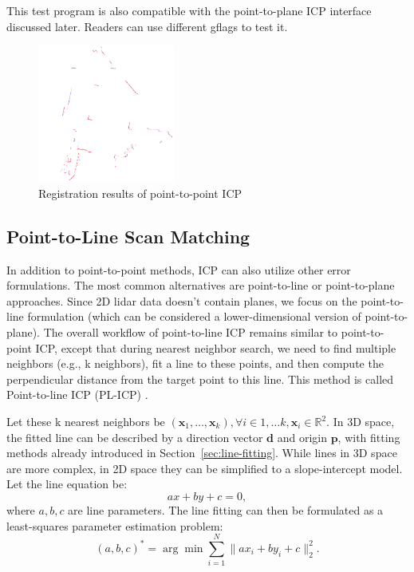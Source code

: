 This test program is also compatible with the point-to-plane ICP interface discussed later. Readers can use different gflags to test it.

\begin{figure}[!htp]
	\centering
	\includegraphics[width=0.4\textwidth]{resources/2d-lidar-mapping/2dicp-s2s}
	\caption{Registration results of point-to-point ICP}
	\label{fig:2dicp-s2s}
\end{figure}

\subsection{Point-to-Line Scan Matching}  
In addition to point-to-point methods, ICP can also utilize other error formulations. The most common alternatives are point-to-line or point-to-plane approaches. Since 2D lidar data doesn't contain planes, we focus on the point-to-line formulation (which can be considered a lower-dimensional version of point-to-plane). The overall workflow of point-to-line ICP remains similar to point-to-point ICP, except that during nearest neighbor search, we need to find multiple neighbors (e.g., k neighbors), fit a line to these points, and then compute the perpendicular distance from the target point to this line. This method is called Point-to-line ICP (PL-ICP) \cite{Censi2008}.

Let these k nearest neighbors be $(\mathbf{x}_1, \ldots, \mathbf{x}_k), \forall i \in 1, \ldots k, \mathbf{x}_i \in \mathbb{R}^2$. In 3D space, the fitted line can be described by a direction vector $\mathbf{d}$ and origin $\mathbf{p}$, with fitting methods already introduced in Section~\ref{sec:line-fitting}. While lines in 3D space are more complex, in 2D space they can be simplified to a slope-intercept model. Let the line equation be:
\begin{equation}\label{key}
	a x + by + c = 0,
\end{equation}
where $a,b,c$ are line parameters. The line fitting can then be formulated as a least-squares parameter estimation problem:
\begin{equation}\label{key}
	(a,b,c)^* = \arg \min \sum_{i=1}^N \| a x_i + by_i + c \|_2^2 .
\end{equation}

